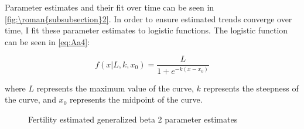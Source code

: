 \documentclass{article}
\renewcommand{\thesubsubsection}{\roman{subsubsection}}
\numberwithin{equation}{subsection}
\newcommand*{\FigureDir}{../../graphs}
\begin{document}
\begin{appendices}
\noindent
Parameter estimates and their fit over time can be seen in \autoref{fig:\thesubsubsection2}. In order to ensure estimated trends converge over time, I fit these parameter estimates to logistic functions. The logistic function can be seen in \ref{eq:Aa4}:

\begin{equation}
   f(x|L, k, x_0) = \frac{L}{1 + e^{-k(x-x_0)}}
\end{equation}

\noindent
where \(L\) represents the maximum value of the curve, \(k\) represents the steepness of the curve, and \(x_0\) represents the midpoint of the curve.

\begin{figure}[H]
   \centering
   \caption{\label{fig:\thesubsubsection2}Fertility estimated generalized beta 2 parameter estimates}
\end{figure}


\end{appendices}
\end{document}

